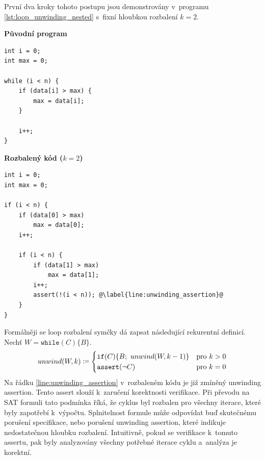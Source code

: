 \documentclass[a4paper, 11pt]{article}
\newcommand{\coloneqq}{%
  \mathrel{\mathop:\!\raisebox{0.2ex}{\scalebox{0.8}{$=$}}}
}
\begin{document}
První dva kroky tohoto postupu jsou demonstrovány v~programu \ref{lst:loop_unwinding_nested} s~fixní hloubkou rozbalení $k = 2$.
\begin{listing}[t]
    \centering

    \begin{minipage}[t]{0.45\textwidth}
        \textbf{Původní program}
        \vspace{0.3em}
        \begin{verbatim}
int i = 0;
int max = 0;

while (i < n) {
    if (data[i] > max) {
        max = data[i];
    }
    
    i++;
}
        \end{verbatim}
        \vspace{0.3em}
    \end{minipage}
    \hfill
    \vrule
    \hfill
    \begin{minipage}[t]{0.48\textwidth}
        \textbf{Rozbalený kód ($k=2$)}
        \vspace{0.3em}
        \begin{verbatim}
int i = 0;
int max = 0;

if (i < n) {
    if (data[0] > max) 
        max = data[0];
    i++; 

    if (i < n) {
        if (data[1] > max) 
            max = data[1];
        i++; 
        assert(!(i < n)); @\label{line:unwinding_assertion}@
    }
}
        \end{verbatim}
        \vspace{0.3em}
    \end{minipage}
    \caption{Transformace cyklu \texttt{while} s neznámou horní mezí $n$ při fixní hloubce rozbalení $k=2$. }
    \label{lst:loop_unwinding_nested}
\end{listing}
Formálněji se loop rozbalení symčky dá zapsat následující rekurentní definicí.
Nechť $W = \texttt{while}(C)\{B\}$.
\[
    unwind(W, k) \coloneqq
    \begin{cases}
        \texttt{if}(C)\{B; \ unwind(W, k-1)\} & \text{pro } k > 0 \\
        \texttt{assert}(\neg C)               & \text{pro } k = 0
    \end{cases}
\]
Na řádku \ref{line:unwinding_assertion} v~rozbaleném kódu je již zmíněný unwinding assertion.
Tento assert slouží k~zaručení korektnosti verifikace.
Při převodu na SAT formuli tato podmínka říká, že cyklus byl rozbalen pro všechny iterace, které byly zapotřebí k~výpočtu.
Splnitelnost formule může odpovídat buď skutečnému porušení specifikace, nebo porušení unwinding assertion, které indikuje nedostatečnou hloubku rozbalení.
Intuitivně, pokud se verifikace  k~tomuto assertu, pak byly analyzovány všechny potřebné iterace cyklu a~analýza je korektní.
\end{document}
